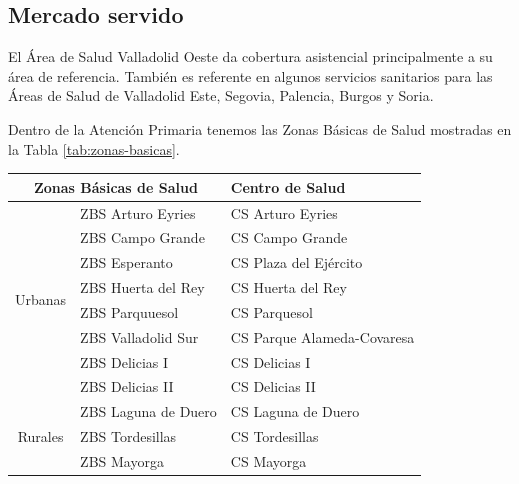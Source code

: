 \subsection{Mercado servido}

El Área de Salud Valladolid Oeste da cobertura asistencial principalmente a su área de referencia. También es referente en algunos servicios sanitarios para las Áreas de Salud de Valladolid Este, Segovia, Palencia, Burgos y Soria.

Dentro de la Atención Primaria tenemos las Zonas Básicas de Salud mostradas en la Tabla \ref{tab:zonas-basicas}.

\begin{table}[H]
    \centering
    \begin{tabular}{cll}
        \toprule
        \multicolumn{2}{c}{Zonas   Básicas de Salud} & Centro de Salud                                      \\
        \midrule
        \multirow{8}{*}{Urbanas}                     & ZBS Arturo Eyries       & CS Arturo Eyries           \\
                                                     & ZBS Campo Grande        & CS Campo Grande            \\
                                                     & ZBS Esperanto           & CS Plaza del Ejército      \\
                                                     & ZBS Huerta del Rey      & CS Huerta del Rey          \\
                                                     & ZBS Parquuesol          & CS Parquesol               \\
                                                     & ZBS Valladolid Sur      & CS Parque Alameda-Covaresa \\
                                                     & ZBS Delicias I          & CS Delicias I              \\
                                                     & ZBS Delicias II         & CS Delicias II             \\
        \midrule
        \multirow{11}{*}{Rurales}                    & ZBS Laguna de Duero     & CS Laguna de Duero         \\
                                                     & ZBS Tordesillas         & CS Tordesillas             \\
                                                     & ZBS Mayorga             & CS Mayorga                 \\

\end{tabular}
\end{table}
